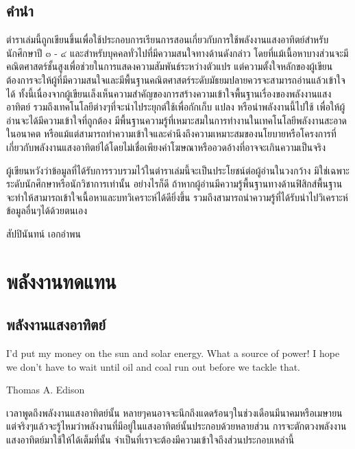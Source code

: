 \documentclass[a4paper,nobib,openany,10pt]{tufte-book}
\begin{document}
\restoregeometry
\pagecolor{White}

\frontmatter


\chapter{คำนำ}
\label{sec:org4500b24}

ตำราเล่มนี้ถูกเขียนขึ้นเพื่อใช้ประกอบการเรียนการสอนเกี่ยวกับการใช้พลังงานแสงอาทิตย์สำหรับนักศึกษาปี ๓ - ๔ และสำหรับบุคคลทั่วไปที่มีความสนใจทางด้านดังกล่าว โดยที่แม้เนื้อหาบางส่วนจะมีคณิตศาสตร์ชั้นสูงเพื่อช่วยในการแสดงความสัมพันธ์ระหว่างตัวแปร แต่ความตั้งใจหลักของผู้เขียนต้องการจะให้ผู้ที่มีความสนใจและมีพื้นฐานคณิตศาสตร์ระดับมัธยมปลายควรจะสามารถอ่านแล้วเข้าใจได้ ทั้งนี้เนื่องจากผู้เขียนเล็งเห็นความสำคัญของการสร้างความเข้าใจพื้นฐานเรื่องของพลังงานแสงอาทิตย์ รวมถึงเทคโนโลยีต่างๆที่จะนำไประยุกต์ใช้เพื่อกักเก็บ แปลง หรือนำพลังงานนี้ไปใช้ เพื่อให้ผู้อ่านจะได้มีความเข้าใจที่ถูกต้อง มีพื้นฐานความรู้ที่เหมาะสมในการทำงานในเทคโนโลยีพลังงานสะอาดในอนาคต หรือแม้แต่สามารถทำความเข้าใจและคำนึงถึงความเหมาะสมของนโยบายหรือโครงการที่เกี่ยวกับพลังงานแสงอาทิตย์ได้โดยไม่เชื่อเพียงคำโฆษณาหรืออวดอ้างที่อาจจะเกินความเป็นจริง

ผู้เขียนหวังว่าข้อมูลที่ได้รับการรวบรวมไว้ในตำราเล่มนี้จะเป็นประโยชน์ต่อผู้อ่านในวงกว้าง
มิใช่เฉพาะระดับนักศึกษาหรือนักวิชาการเท่านั้น อย่างไรก็ดี
ถ้าหากผู้อ่านมีความรู้พื้นฐานทางด้านฟิสิกส์พื้นฐาน
จะทำให้สามารถเข้าใจเนื้อหาและบทวิเคราะห์ได้ดียิ่งขึ้น
รวมถึงสามารถนำความรู้ที่ได้รับนำไปวิเคราะห์ข้อมูลอื่นๆได้ด้วยตนเอง

สัปปินันทน์ เอกอำพน

\tableofcontents

\listoffigures

\listoftables

\mainmatter


\part{พลังงานทดแทน}
\label{sec:org3ce55c5}
\chapter{พลังงานแสงอาทิตย์}
\label{sec:org236bd30}

\epigraph{I'd put my money on the sun and solar energy. What a source of power! I hope we don't have to wait until oil and coal run out before we tackle that.}{Thomas A. Edison}

เวลาพูดถึงพลังงานแสงอาทิตย์นั้น
หลายๆคนอาจจะนึกถึงแดดร้อนๆในช่วงเดือนมีนาคมหรือเมษายน
แต่จริงๆแล้วจะรู้ไหมว่าพลังงานที่มีอยู่ในแสงอาทิตย์นั้นประกอบด้วยหลายส่วน
การจะตักตวงพลังงานแสงอาทิตย์มาใช้ให้ได้เต็มที่นั้น
จำเป็นที่เราจะต้องมีความเข้าใจถึงส่วนประกอบเหล่านี้
\end{document}
